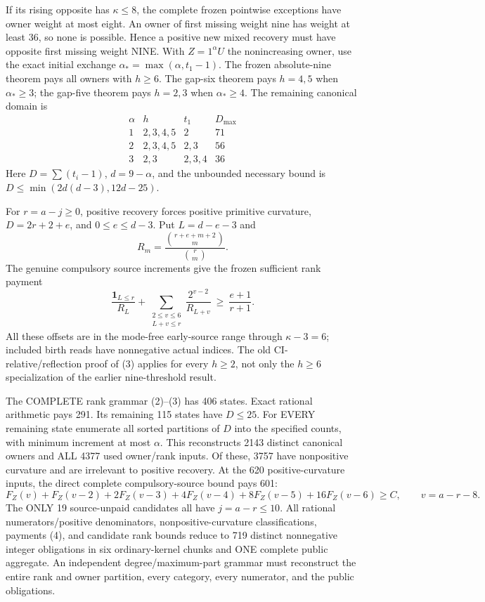 \documentclass[11pt]{article}
\begin{document}
If its rising opposite has $\kappa\le8$, the complete frozen pointwise
exceptions have owner weight at most eight. An owner of first missing
weight nine has weight at least 36, so none is possible. Hence a positive
new mixed recovery must have opposite first missing weight NINE.
With $Z=1^\alpha U$ the nonincreasing owner, use the exact initial
exchange $\alpha_* =\max(\alpha,t_1-1)$.
The frozen absolute-nine theorem pays all owners with $h\ge6$.
The gap-six theorem pays $h=4,5$ when $\alpha_*\ge3$; the gap-five
theorem pays $h=2,3$ when $\alpha_*\ge4$.
The remaining canonical domain is
\[
\begin{array}{c|c|c|c}
 \alpha& h& t_1& D_{\max}\\\hline
 1&2,3,4,5&2&71\\
 2&2,3,4,5&2,3&56\\
 3&2,3&2,3,4&36
\end{array}                                                     \tag{2}
\]
Here $D=\sum(t_i-1)$, $d=9-\alpha$, and the unbounded necessary
bound is $D\le\min(2d(d-3),12d-25)$.

For $r=a-j\ge0$, positive recovery forces positive primitive curvature,
$D=2r+2+e$, and $0\le e\le d-3$. Put $L=d-e-3$ and
\[
 R_m=\frac{\binom{r+e+m+2}{m}}{\binom r m}.
\]
The genuine compulsory source increments give the frozen sufficient
rank payment
\[
 \frac{\mathbf1_{L\le r}}{R_L}
 +\sum_{\substack{2\le v\le6\\L+v\le r}}
       \frac{2^{v-2}}{R_{L+v}}\ \ge\ \frac{e+1}{r+1}.    \tag{3}
\]
All these offsets are in the mode-free early-source range through
$\kappa-3=6$; included birth reads have nonnegative actual indices.
The old CI-relative/reflection proof of (3) applies for every $h\ge2$,
not only the $h\ge6$ specialization of the earlier nine-threshold result.

The COMPLETE rank grammar (2)--(3) has 406 states. Exact rational
arithmetic pays 291. Its remaining 115 states have $D\le25$.
For EVERY remaining state enumerate all sorted partitions of $D$ into
the specified counts, with minimum increment at most $\alpha$.
This reconstructs 2143 distinct canonical owners and ALL 4377 used
owner/rank inputs. Of these, 3757 have nonpositive curvature and are
irrelevant to positive recovery. At the 620 positive-curvature inputs,
the direct complete compulsory-source bound pays 601:
\[
 F_Z(v)+F_Z(v-2)+2F_Z(v-3)+4F_Z(v-4)
                  +8F_Z(v-5)+16F_Z(v-6)\ge C,
 \qquad v=a-r-8.                                      \tag{4}
\]
The ONLY 19 source-unpaid candidates all have $j=a-r\le10$.
All rational numerators/positive denominators, nonpositive-curvature
classifications, payments (4), and candidate rank bounds reduce to
719 distinct nonnegative integer obligations in six ordinary-kernel
chunks and ONE complete public aggregate. An independent degree/maximum-part
grammar must reconstruct the entire rank and owner partition, every
category, every numerator, and the public obligations.
\end{document}
